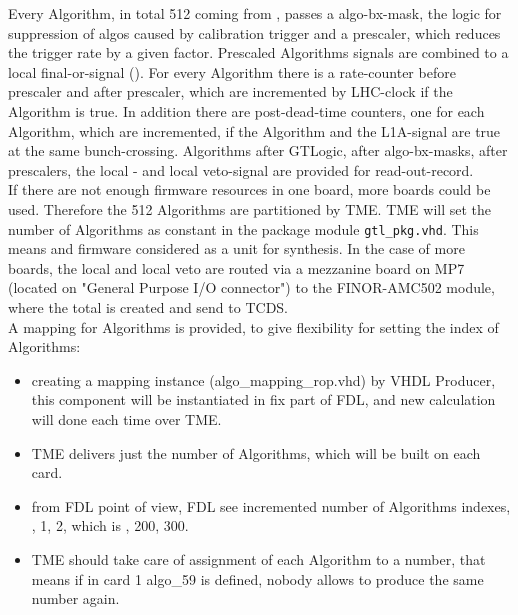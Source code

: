 Every Algorithm, in total 512 coming from \ugtl, passes a algo-bx-mask, the logic for suppression of algos caused by calibration trigger and a prescaler, which reduces the trigger rate by a given factor. Prescaled Algorithms signals are combined to a local final-or-signal (\finor).
For every Algorithm there is a rate-counter before prescaler and after prescaler, which are incremented by LHC-clock if the Algorithm is true. In addition there are post-dead-time counters, one for each Algorithm, which are incremented,
if the Algorithm and the L1A-signal are true at the same bunch-crossing.
Algorithms after GTLogic, after algo-bx-masks, after prescalers, the local \finor- and local veto-signal are provided for read-out-record.\\
If there are not enough firmware resources in one \ugt board, more boards could be used. Therefore the 512 Algorithms are partitioned by TME. TME will set the number of Algorithms as
constant in the package module \texttt{gtl\_pkg.vhd}. This means \ugtl and \ufdl firmware considered as a unit for synthesis. In the case of more \ugt boards, the local \finor and local veto are routed via
a mezzanine board on MP7 (located on "General Purpose I/O connector") to the FINOR-AMC502 module, where the total \finor is created and send to TCDS.\\
A mapping for Algorithms is provided, to give flexibility for setting the index of Algorithms:
\begin {itemize}
\item creating a mapping instance (algo\_mapping\_rop.vhd) by VHDL Producer, this component will be instantiated in fix part of FDL, and new calculation will done each time over TME.
\item TME delivers just the number of Algorithms, which will be built on each card.
\item from FDL point of view, FDL see incremented number of Algorithms indexes, , 1, 2, which is , 200, 300.
\item TME should take care of assignment of each Algorithm to a number, that means if in card 1 algo\_59 is defined, nobody allows to produce the same number again.
\end {itemize}

